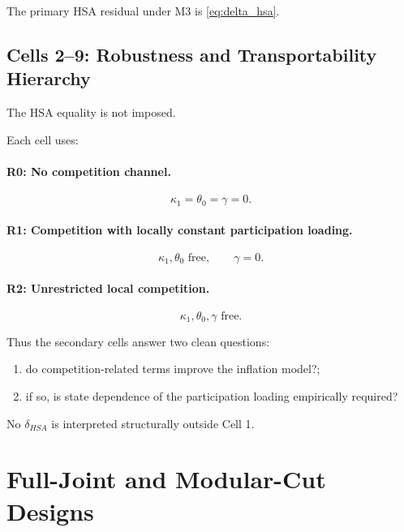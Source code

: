 \documentclass[11pt]{article}
\begin{document}
The primary HSA residual under M3 is \cref{eq:delta_hsa}.

\subsection{Cells 2--9: Robustness and Transportability Hierarchy}

The HSA equality is not imposed.

Each cell uses:

\paragraph{R0: No competition channel.}
\begin{equation}
\kappa_1=\theta_0=\gamma=0.
\end{equation}

\paragraph{R1: Competition with locally constant participation loading.}
\begin{equation}
\kappa_1,\theta_0
\text{ free},
\qquad
\gamma=0.
\end{equation}

\paragraph{R2: Unrestricted local competition.}
\begin{equation}
\kappa_1,\theta_0,\gamma
\text{ free}.
\end{equation}

Thus the secondary cells answer two clean questions:
\begin{enumerate}
\item do competition-related terms improve the inflation model?;
\item if so, is state dependence of the participation loading empirically required?
\end{enumerate}

No \(\delta_{HSA}\) is interpreted structurally outside Cell 1.

\section{Full-Joint and Modular-Cut Designs}
\end{document}
